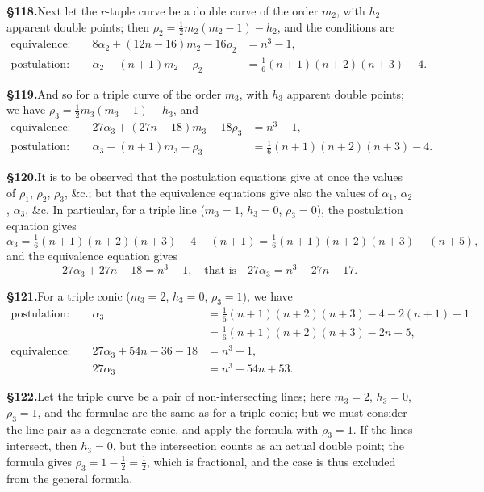 \documentclass[11pt,a4paper]{article}
\begin{document}
\textbf{\S 118.}\quad Next let the $r$-tuple curve be a double curve of the order $m_2$, with $h_2$ apparent double points; then $\rho_2 = \frac{1}{2}m_2(m_2 - 1) - h_2$, and the conditions are
\begin{align*}
\text{equivalence: } && 8\alpha_2 + (12n - 16)m_2 - 16\rho_2 &= n^3 - 1, \\
\text{postulation: } && \alpha_2 + (n + 1)m_2 - \rho_2 &= \tfrac{1}{6}(n + 1)(n + 2)(n + 3) - 4.
\end{align*}

\textbf{\S 119.}\quad And so for a triple curve of the order $m_3$, with $h_3$ apparent double points; we have $\rho_3 = \frac{1}{2}m_3(m_3 - 1) - h_3$, and
\begin{align*}
\text{equivalence: } && 27\alpha_3 + (27n - 18)m_3 - 18\rho_3 &= n^3 - 1, \\
\text{postulation: } && \alpha_3 + (n + 1)m_3 - \rho_3 &= \tfrac{1}{6}(n + 1)(n + 2)(n + 3) - 4.
\end{align*}

\textbf{\S 120.}\quad It is to be observed that the postulation equations give at once the values of $\rho_1$, $\rho_2$, $\rho_3$, \&c.; but that the equivalence equations give also the values of $\alpha_1$, $\alpha_2$, $\alpha_3$, \&c. In particular, for a triple line ($m_3 = 1$, $h_3 = 0$, $\rho_3 = 0$), the postulation equation gives
\[
\alpha_3 = \tfrac{1}{6}(n + 1)(n + 2)(n + 3) - 4 - (n + 1) = \tfrac{1}{6}(n + 1)(n + 2)(n + 3) - (n + 5),
\]
and the equivalence equation gives
\[
27\alpha_3 + 27n - 18 = n^3 - 1, \quad\text{that is}\quad 27\alpha_3 = n^3 - 27n + 17.
\]

\textbf{\S 121.}\quad For a triple conic ($m_3 = 2$, $h_3 = 0$, $\rho_3 = 1$), we have
\begin{align*}
\text{postulation: } && \alpha_3 &= \tfrac{1}{6}(n + 1)(n + 2)(n + 3) - 4 - 2(n + 1) + 1 \\
&&&= \tfrac{1}{6}(n + 1)(n + 2)(n + 3) - 2n - 5, \\
\text{equivalence: } && 27\alpha_3 + 54n - 36 - 18 &= n^3 - 1, \\
&& 27\alpha_3 &= n^3 - 54n + 53.
\end{align*}

\textbf{\S 122.}\quad Let the triple curve be a pair of non-intersecting lines; here $m_3 = 2$, $h_3 = 0$, $\rho_3 = 1$, and the formulae are the same as for a triple conic; but we must consider the line-pair as a degenerate conic, and apply the formula with $\rho_3 = 1$. If the lines intersect, then $h_3 = 0$, but the intersection counts as an actual double point; the formula gives $\rho_3 = 1 - \frac{1}{2} = \frac{1}{2}$, which is fractional, and the case is thus excluded from the general formula.
\end{document}
